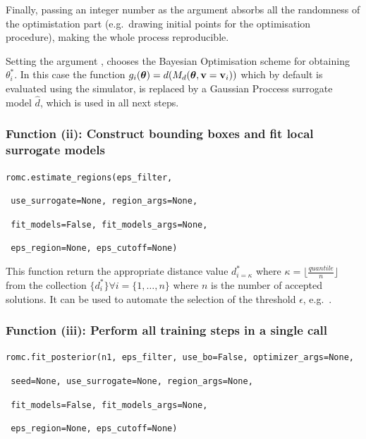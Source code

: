 Finally, passing an integer number as the argument 
absorbs all the randomness of the optimistation part (e.g.\ drawing
initial points for the optimisation procedure), making the whole
process reproducible.

Setting the argument , chooses the Bayesian
Optimisation scheme for obtaining $\theta_i^*$. In this case the
function $g_i(\boldsymbol{\theta}) = d(M_d(\boldsymbol{\theta},\mathbf{v}=\mathbf{v}_i))$ which by default
is evaluated using the simulator, is replaced by a Gaussian Proccess
surrogate model $\hat{d}$, which is used in all next steps.

\subsubsection*{Function (ii): Construct bounding boxes and fit local surrogate models}

\texttt{romc.estimate_regions(eps_filter,}
  
      \texttt{                      use_surrogate=None, region_args=None,}
  
      \texttt{                      fit_models=False, fit_models_args=None,}
  
      \texttt{                      eps_region=None, eps_cutoff=None)}
\vspace{5mm}

\noindent
This function return the appropriate distance value $d_{i=\kappa}^*$
where $\kappa = \lfloor \frac{quantile}{n} \rfloor$ from the
collection $\{ d_i^* \} \forall i = \{1, \ldots, n\}$ where $n$ is the
number of accepted solutions. It can be used to automate the selection
of the threshold $\epsilon$, e.g.\
.

\subsubsection*{Function (iii): Perform all training steps in a single call}


\texttt{romc.fit_posterior(n1, eps_filter, use_bo=False, optimizer_args=None,}
  
          \texttt{                   seed=None, use_surrogate=None, region_args=None,}
  
          \texttt{                   fit_models=False, fit_models_args=None,}
  
          \texttt{                   eps_region=None, eps_cutoff=None)}

